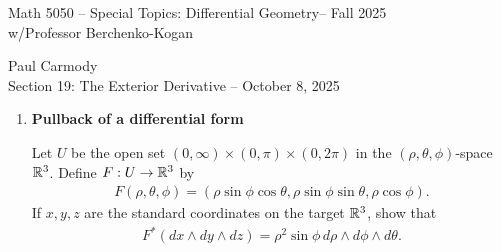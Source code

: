 \documentclass[12pt,a4paper]{report}
\newcommand{\CLASSNAME}{Math 5050 -- Special Topics: Differential Geometry}
\newcommand{\STUDENTNAME}{Paul Carmody}
\newcommand{\ASSIGNMENT}{Section 19: The Exterior Derivative }
\newcommand{\DUEDATE}{October 8, 2025}
\newcommand{\PROFESSOR}{Professor Berchenko-Kogan}
\newcommand{\SEMESTER}{Fall 2025}
\begin{document}
\begin{center}
	\Large{\CLASSNAME -- \SEMESTER} \\
	\large{ w/\PROFESSOR}
\end{center}
\begin{center}
	\STUDENTNAME \\
	\ASSIGNMENT -- \DUEDATE\\
\end{center} 


\begin{enumerate}[label=19.\arabic*]

\item \textbf{Pullback of a differential form}

Let $U$ be the open set $(0,\infty)\times(0,\pi)\times(0,2\pi)$ in the $(\rho,\theta,\phi)$-space $\mathbb{R}^3$.  Define $F: U \to \mathbb{R}^3$ by
\begin{align*}
	F(\rho, \theta, \phi) =(\rho\sin\phi\cos\theta,\rho\sin\phi\sin\theta,\rho\cos\phi).
\end{align*}If $x,y,z$ are the standard coordinates on the target $\mathbb{R}^3$, show that 
\begin{align*}
	F^*(dx\wedge dy\wedge dz) = \rho^2\sin\phi\, d\rho\wedge d\phi\wedge d\theta.
\end{align*}


\end{enumerate}
\end{document}
